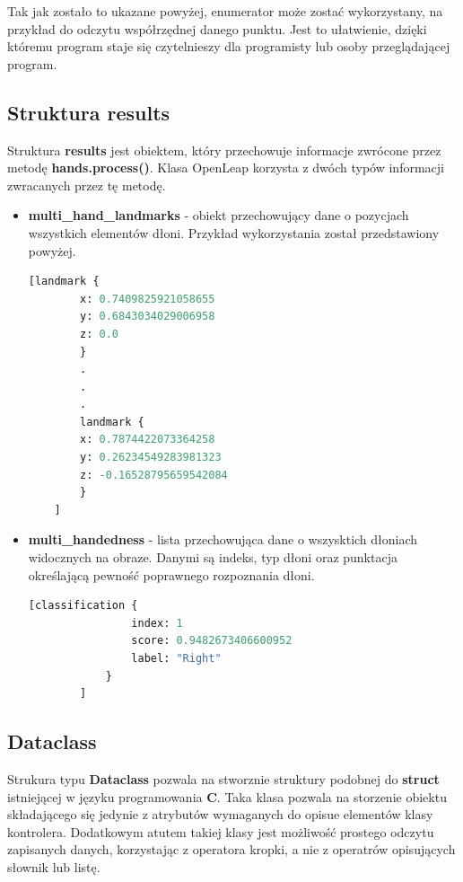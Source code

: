 \quad Tak jak zostało to ukazane powyżej, enumerator może zostać wykorzystany, na przykład do odczytu współrzędnej danego punktu. Jest to ułatwienie, dzięki któremu program staje się czytelnieszy dla programisty lub osoby przeglądającej program. 

\subsection{Struktura results}

\quad Struktura \textbf{results} jest obiektem, który przechowuje informacje zwrócone przez metodę \textbf{hands.process()}. Klasa OpenLeap korzysta z dwóch typów informacji zwracanych przez tę metodę. 

\begin{itemize}
    \item \textbf{multi\_hand\_landmarks} - obiekt przechowujący dane o pozycjach wszystkich elementów dłoni. Przykład wykorzystania został przedstawiony powyżej. 
    
    \begin{lstlisting}[caption={Przykład elementu obiektu},captionpos=b,language=python, style=command]
    [landmark {
        x: 0.7409825921058655
        y: 0.6843034029006958
        z: 0.0
        }
        .
        .
        .
        landmark {
        x: 0.7874422073364258
        y: 0.26234549283981323
        z: -0.16528795659542084
        }
    ]
    \end{lstlisting}
    

    \item \textbf{multi\_handedness} - lista przechowująca dane o wszysktich dłoniach widocznych na obraze. Danymi są indeks, typ dłoni oraz punktacja określającą pewność poprawnego rozpoznania dłoni. 
    \begin{lstlisting}[caption={Przykład elementu obiektu},captionpos=b,language=python,style=command]
        [classification {
                index: 1
                score: 0.9482673406600952
                label: "Right"
            }
        ]
    \end{lstlisting}
\end{itemize}

\subsection{Dataclass}

\quad Strukura typu \textbf{Dataclass} pozwala na stworznie struktury podobnej do \textbf{struct} istniejącej w języku programowania \textbf{C}. Taka klasa pozwala na storzenie obiektu składającego się jedynie z atrybutów wymaganych do opisue elementów klasy kontrolera. Dodatkowym atutem takiej klasy jest możliwość prostego odczytu zapisanych danych, korzystając z operatora kropki, a nie z operatrów opisujących słownik lub listę. 

